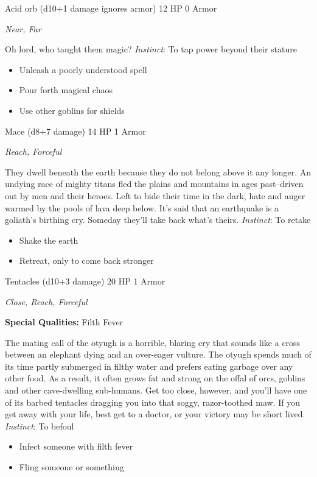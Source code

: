 \newpage
\HRule
{}

Acid orb (d10+1 damage ignores armor) \hspace*{\fill}12 HP 0 Armor

\emph{Near, Far}

\HRule
Oh lord, who taught them magic? \emph{Instinct}: To tap power beyond their stature
\begin{itemize}
\item Unleash a poorly understood spell
\item Pour forth magical chaos
\item Use other goblins for shields
\end{itemize}

\HRule
{}

Mace (d8+7 damage) \hspace*{\fill}14 HP 1 Armor

\emph{Reach, Forceful}

\HRule
They dwell beneath the earth because they do not belong above it any longer. An undying race of mighty titans fled the plains and mountains in ages past--driven out by men and their heroes. Left to bide their time in the dark, hate and anger warmed by the pools of lava deep below. It's said that an earthquake is a goliath's birthing cry. Someday they'll take back what's theirs. \emph{Instinct}: To retake
\begin{itemize}
\item Shake the earth
\item Retreat, only to come back stronger
\end{itemize}

\newpage
\HRule
{}

Tentacles (d10+3 damage) \hspace*{\fill}20 HP 1 Armor

\emph{Close, Reach, Forceful}

\textbf{Special Qualities:}
Filth Fever

\HRule
The mating call of the otyugh is a horrible, blaring cry that sounds like a cross between an elephant dying and an over-eager vulture. The otyugh spends much of its time partly submerged in filthy water and prefers eating garbage over any other food. As a result, it often grows fat and strong on the offal of orcs, goblins and other cave-dwelling sub-humans. Get too close, however, and you'll have one of its barbed tentacles dragging you into that soggy, razor-toothed maw. If you get away with your life, best get to a doctor, or your victory may be short lived. \emph{Instinct}: To befoul
\begin{itemize}
\item Infect someone with filth fever
\item Fling someone or something
\end{itemize}

